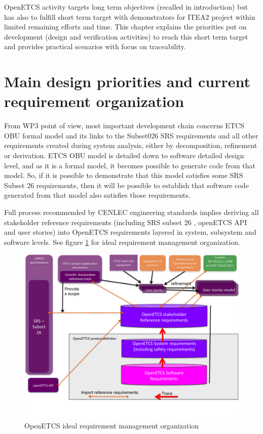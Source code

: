 \documentclass[11pt]{template/openetcs_report}
\begin{document}
OpenETCS activity targets long term objectives (recalled in introduction) but has also to fulfill short term target with demonstrators for ITEA2 project within limited remaining efforts and time. 
This chapter explains the priorities put on development (design and verification activities) to reach this short term target and provides practical scenarios with focus on traceability.

\section{Main design priorities and current requirement organization}
From WP3 point of view, most important development chain concerns ETCS OBU formal model and its links to the Subset026 SRS requirements and all other requirements created during system analysis, either by decomposition, refinement or derivation. 
ETCS OBU model is detailed down to software detailed design level, and as it is a formal model, it becomes possible to generate code from that model. So, if it is possible to demonstrate that this model satisfies some SRS Subset 26 requirements, then it will be possible to establish that software code generated from that model also satisfies those requirements.

Full process recommended by CENLEC engineering standards implies deriving all stakeholder reference requirements (including SRS subset 26 , openETCS API and user stories) into OpenETCS requirements layered in system, subsystem and software levels.
See figure \ref{fig:idealRequirementOrganization} for ideal requirement management organization.

\begin{figure}[htbp]
\centering
\includegraphics[width=1\linewidth]{./images/idealRequirementOrganization.png}
\caption{OpenETCS ideal requirement management organization}
\label{fig:idealRequirementOrganization}
\end{figure}
\end{document}
